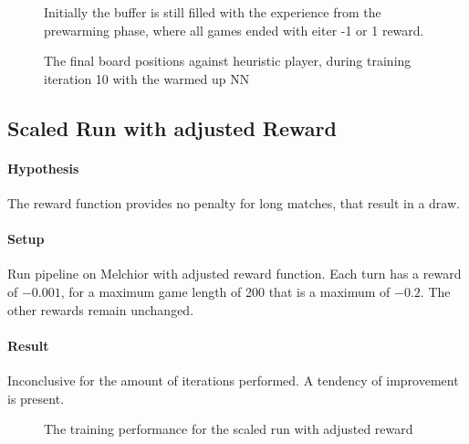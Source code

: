 \begin{figure}[!h]
    \centering
    \hfill
    \caption{Initially the buffer is still filled with the experience from the prewarming phase, where all games ended with eiter -1 or 1 reward.}
    \label{performance_remote_warmed_up_exp_buffer}
\end{figure}

\begin{figure}[!h]
    \centering
    \caption{The final board positions against heuristic player, during training iteration 10 with the warmed up NN}
    \label{performance_remote_warmed_up_heuristic}
\end{figure}

\subsection{Scaled Run with adjusted Reward}
\paragraph{Hypothesis} The reward function provides no penalty for long matches, that result in a draw.
\paragraph{Setup} Run pipeline on Melchior with adjusted reward function. Each turn has a reward of $-0.001$, for a maximum game length of 200 that is a maximum of $-0.2$. The other rewards remain unchanged.

\paragraph{Result} Inconclusive for the amount of iterations performed. A tendency of improvement is present.
\begin{figure}[!h]
    \centering
    \hfill
    \caption{The training performance for the scaled run with adjusted reward}
    \label{performance_remote_diff_z}
\end{figure}

